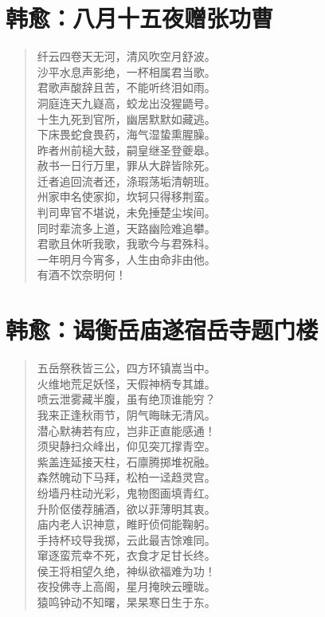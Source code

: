 \documentclass[12pt,oneside]{book}
\newenvironment{shici}{%
\begin{verse}\centering\yanti\large\hspace{12pt}}{\end{verse}}
\begin{document}
\begin{common-format}
\chapter{韩愈：八月十五夜赠张功曹}
\begin{shici}
纤云四卷天无河，清风吹空月舒波。\\
沙平水息声影绝，一杯相属君当歌。\\
君歌声酸辞且苦，不能听终泪如雨。\\
洞庭连天九嶷高，蛟龙出没猩鼯号。\\
十生九死到官所，幽居默默如藏逃。\\
下床畏蛇食畏药，海气湿蛰熏腥臊。\\
昨者州前槌大鼓，嗣皇继圣登夔皋。\\
赦书一日行万里，罪从大辟皆除死。\\
迁者追回流者还，涤瑕荡垢清朝班。\\
州家申名使家抑，坎轲只得移荆蛮。\\
判司卑官不堪说，未免捶楚尘埃间。\\
同时辈流多上道，天路幽险难追攀。\\
君歌且休听我歌，我歌今与君殊科。\\
一年明月今宵多，人生由命非由他。\\
有酒不饮奈明何！
\end{shici}

\chapter{韩愈：谒衡岳庙遂宿岳寺题门楼}
\begin{shici}
五岳祭秩皆三公，四方环镇嵩当中。\\
火维地荒足妖怪，天假神柄专其雄。\\
喷云泄雾藏半腹，虽有绝顶谁能穷？\\
我来正逢秋雨节，阴气晦昧无清风。\\
潜心默祷若有应，岂非正直能感通！\\
须臾静扫众峰出，仰见突兀撑青空。\\
紫盖连延接天柱，石廪腾掷堆祝融。\\
森然魄动下马拜，松柏一迳趋灵宫。\\
纷墙丹柱动光彩，鬼物图画填青红。\\
升阶伛偻荐脯酒，欲以菲薄明其衷。\\
庙内老人识神意，睢盱侦伺能鞠躬。\\
手持杯珓导我掷，云此最吉馀难同。\\
窜逐蛮荒幸不死，衣食才足甘长终。\\
侯王将相望久绝，神纵欲福难为功！\\
夜投佛寺上高阁，星月掩映云曈昽。\\
猿鸣钟动不知曙，杲杲寒日生于东。
\end{shici}


\end{common-format}
\end{document}
